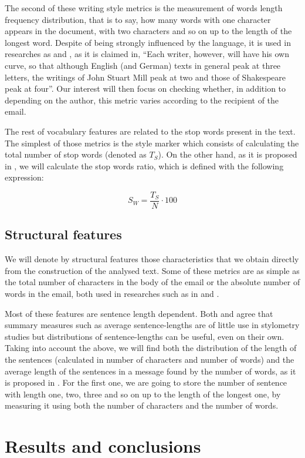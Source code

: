 The second of these writing style metrics is the measurement of words length frequency distribution, that is to say, how many words with one character appears in the document, with two characters and so on up to the length of the longest word. Despite of being strongly influenced by the language, it is used in researches as \cite{corney2001identifying} and \cite{kemp1976personal}, as it is claimed in\cite{allen1974methods}, ``Each writer, however, will have his own curve, so that although English (and German) texts in general peak at three letters, the writings of John Stuart Mill peak at two and those of Shakespeare peak at four''. Our interest will then focus on checking whether, in addition to depending on the author, this metric varies according to the recipient of the email.

The rest of vocabulary features are related to the stop words present in the text. The simplest of those metrics is the style marker which consists of calculating the total number of stop words (denoted as $T_S$). On the other hand, as it is proposed in \cite{ril2014determination},  we will calculate the stop words ratio, which is defined with the following expression:

$$
S_W = \frac{T_S}{N}\cdot 100
$$

\subsection{Structural features}\label{ssect:strucf}

We will denote by structural features those characteristics that we obtain directly from the construction of the analysed text. Some of these metrics are as simple as the total number of characters in the body of the email or the absolute number of words in the email, both used in researches such as in \cite{corney2001identifying} and \cite{ril2014determination}.

Most of these features are sentence length dependent. Both \cite{tallentire1972appraisal} and \cite{kjetsaa1979and} agree that summary measures such as average sentence-lengths are of little use in stylometry studies but distributions of sentence-lengths can be useful, even on their own. Taking into account the above, we will find both the distribution of the length of the sentences (calculated in number of characters and number of words) and the average length of the sentences in a message found by the number of words, as it is proposed in \cite{corney2001identifying}. For the first one, we are going to store the number of sentence with length one, two, three and so on up to the length of the longest one, by measuring it  using both the number of characters and the number of words.

\section{Results and conclusions} \label{section:resconc}
